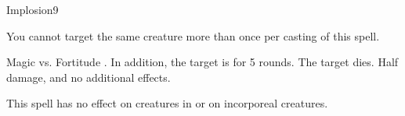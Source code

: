 \begin{spellsection}{Implosion}{9}
    \begin{spellheader}
    \end{spellheader}
    \begin{spellcontent}
        \begin{spelltargetinginfo}
            \spellspecial You cannot target the same creature more than once per casting of this spell.
        \end{spelltargetinginfo}
        \begin{spelleffects}
            \begin{spellattack}{Magic vs. Fortitude}
                \spellsuccess {}. In addition, the target is \staggered for 5 rounds.
                \spellcritical The target dies.
                \spellfailure Half damage, and no additional effects.
            \end{spellattack}
        \end{spelleffects}
    \end{spellcontent}
    \begin{spellfooter}
        \spellnotes This spell has no effect on creatures in  or on incorporeal creatures.
        \miscastexplode
    \end{spellfooter}
\end{spellsection}

